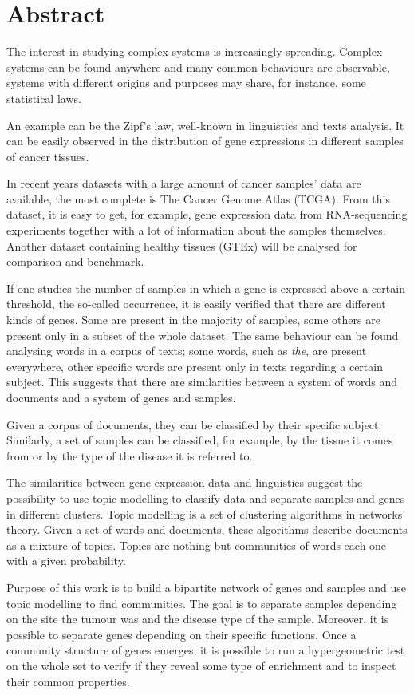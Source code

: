 \chapter*{Abstract}
The interest in studying complex systems is increasingly spreading.
Complex systems can be found anywhere and many common behaviours are
observable, systems with different origins and purposes may share, for
instance, some statistical laws.

An example can be the Zipf's law, well-known in linguistics and texts
analysis. It can be easily observed in the distribution of gene expressions
in different samples of cancer tissues.

In recent years datasets with a large amount of cancer samples' data are
available, the most complete is The Cancer Genome Atlas (TCGA). From
this dataset, it is easy to get, for example, gene expression data from
RNA-sequencing experiments together with a lot of information about the
samples themselves. Another dataset containing healthy tissues (GTEx) will be analysed for comparison and benchmark.

If one studies the number of samples in which a gene is expressed above
a certain threshold, the so-called occurrence, it is easily verified
that there are different kinds of genes. Some are present in the
majority of samples, some others are present only in a subset of the
whole dataset. The same behaviour can be found analysing words in
a corpus of texts; some words, such as \emph{the}, are present everywhere,
other specific words are present only in texts regarding a certain
subject. This suggests that there are similarities between a system of
words and documents and a system of genes and samples.

Given a corpus of documents, they can be classified by their specific
subject. Similarly, a set of samples can be classified, for
example, by the tissue it comes from or by the type of the disease it is
referred to.

The similarities between gene expression data and linguistics suggest
the possibility to use topic modelling to classify data and separate
samples and genes in different clusters. Topic modelling is a set of
clustering algorithms in networks' theory. Given a set of words and
documents, these algorithms describe documents as a mixture of topics. Topics are
nothing but communities of words each one with a given probability.

Purpose of this work is to build a bipartite network of genes and
samples and use topic modelling to find communities. The goal is to
separate samples depending on the site the tumour was and the disease
type of the sample. Moreover, it is possible to separate genes depending
on their specific functions. Once a community structure of genes
emerges, it is possible to run a hypergeometric test on the whole set to verify if they reveal some type of enrichment and to inspect
their common properties.

